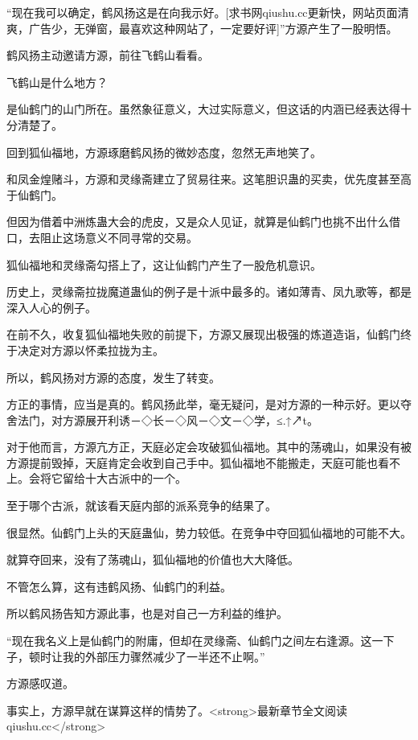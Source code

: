 
\begin{this_body}

“现在我可以确定，鹤风扬这是在向我示好。[求书网qiushu.cc更新快，网站页面清爽，广告少，无弹窗，最喜欢这种网站了，一定要好评]”方源产生了一股明悟。

鹤风扬主动邀请方源，前往飞鹤山看看。

飞鹤山是什么地方？

是仙鹤门的山门所在。虽然象征意义，大过实际意义，但这话的内涵已经表达得十分清楚了。

回到狐仙福地，方源琢磨鹤风扬的微妙态度，忽然无声地笑了。

和凤金煌赌斗，方源和灵缘斋建立了贸易往来。这笔胆识蛊的买卖，优先度甚至高于仙鹤门。

但因为借着中洲炼蛊大会的虎皮，又是众人见证，就算是仙鹤门也挑不出什么借口，去阻止这场意义不同寻常的交易。

狐仙福地和灵缘斋勾搭上了，这让仙鹤门产生了一股危机意识。

历史上，灵缘斋拉拢魔道蛊仙的例子是十派中最多的。诸如薄青、凤九歌等，都是深入人心的例子。

在前不久，收复狐仙福地失败的前提下，方源又展现出极强的炼道造诣，仙鹤门终于决定对方源以怀柔拉拢为主。

所以，鹤风扬对方源的态度，发生了转变。

方正的事情，应当是真的。鹤风扬此举，毫无疑问，是对方源的一种示好。更以夺舍法门，对方源展开利诱－◇长－◇风－◇文－◇学，≤.↑↗t。

对于他而言，方源亢方正，天庭必定会攻破狐仙福地。其中的荡魂山，如果没有被方源提前毁掉，天庭肯定会收到自己手中。狐仙福地不能搬走，天庭可能也看不上。会将它留给十大古派中的一个。

至于哪个古派，就该看天庭内部的派系竞争的结果了。

很显然。仙鹤门上头的天庭蛊仙，势力较低。在竞争中夺回狐仙福地的可能不大。

就算夺回来，没有了荡魂山，狐仙福地的价值也大大降低。

不管怎么算，这有违鹤风扬、仙鹤门的利益。

所以鹤风扬告知方源此事，也是对自己一方利益的维护。

“现在我名义上是仙鹤门的附庸，但却在灵缘斋、仙鹤门之间左右逢源。这一下子，顿时让我的外部压力骤然减少了一半还不止啊。”

方源感叹道。

事实上，方源早就在谋算这样的情势了。<strong>最新章节全文阅读qiushu.cc</strong>


\end{this_body}
